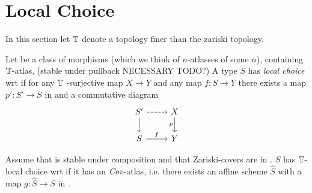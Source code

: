 
\section{Local Choice}
In this section let $\mathbb{T}$ denote a topology finer than the zariski topology.
\begin{definition}
	Let \Cov be a class of morphisms (which we think of $n$-atlasses of some $n$), containing $\mathbb{T}$-atlas, (stable under pullback NECESSARY TODO?)
	A type $S$ has \emph{local choice} wrt \Cov if for any $\mathbb{T}$ -surjective map $X \to Y$ and any map $f : S \to Y$ there exists a map  $p' : S' \to S$ in \Cov and a commutative diagram
	\[\begin{tikzcd}
		{S'} & X \\
		S & Y
		\arrow[dashed, from=1-1, to=1-2]
		\arrow[from=1-1, to=2-1]
		\arrow["p"', from=1-2, to=2-2]
		\arrow["f",from=2-1, to=2-2]
	\end{tikzcd}\]
\end{definition}
\begin{prop}{\label{prop:LocalChoice}}
	Assume that \Cov is stable under composition and that Zariski-covers are in \Cov.
	$S$ has  $\mathbb{T}$-local choice wrt \Cov if it has an $\emph{Cov}$-atlas, i.e. there exists an affine scheme $\hat{S}$ with a map $g : \hat{S} \to S$ in \Cov. %
\end{prop}
